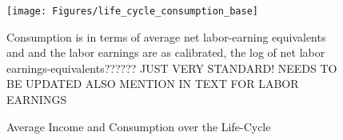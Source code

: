 \documentclass[12pt,a4paper,leqno]{article}
\theoremstyle{definition}
\begin{document}
\begin{figure}[!htbp]
\caption{Average Income and Consumption over the Life-Cycle} 
\label{consumption_life_cycle}	%
\centering
\texttt{[image: Figures/life\_cycle\_consumption\_base]}  %

\begin{minipage}{0.8\linewidth}
\footnotesize{Consumption is in terms of average net labor-earning equivalents and and the labor earnings are as calibrated, the log of net labor earnings-equivalents?????? JUST VERY STANDARD! NEEDS TO BE UPDATED ALSO MENTION IN TEXT FOR LABOR EARNINGS}
\end{minipage}

\end{figure}
\end{document}
